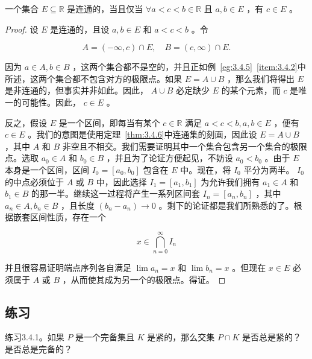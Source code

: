 \begin{Thm}
  \label{thm:3.4.7}
  一个集合 \(E \subseteq  \mathbb{R}\) 是连通的，当且仅当 \(\forall a < c < b\in \mathbb{R}\)  且 \(a,b \in  E\) ，有 \(c \in  E\) 。
\end{Thm}
\begin{proof}
设 \(E\) 是连通的，且设 \(a,b \in  E\) 和 \(a < c < b\) 。令

\[
A = \left( {-\infty ,c}\right)  \cap  E, \quad B = \left( {c,\infty }\right)  \cap  E.
\]

因为 \(a \in  A, b \in  B\) ，这两个集合都不是空的，并且正如例~\ref{eg:3.4.5}~\ref{item:3.4.2}中所述，这两个集合都不包含对方的极限点。如果 \(E = A \cup  B\) ，那么我们将得出 \(E\) 是非连通的，但事实并非如此。因此， \(A \cup  B\) 必定缺少 \(E\) 的某个元素，而 \(c\) 是唯一的可能性。因此， \(c \in  E\) 。

反之，假设 \(E\) 是一个区间，即每当有某个 $c\in \mathbb{R}$ 满足 \(a < c < b, a,b\in E\) ，便有 \(c \in  E\) 。我们的意图是使用定理~\ref{thm:3.4.6}中连通集的刻画，因此设 \(E = A \cup  B\) ，其中 \(A\) 和 \(B\) 非空且不相交。我们需要证明其中一个集合包含另一个集合的极限点。选取 \({a}_{0} \in  A\) 和 \({b}_{0} \in  B\) ，并且为了论证方便起见，不妨设 \({a}_{0} < {b}_{0}\) 。由于 \(E\) 本身是一个区间，区间 \({I}_{0} = \left\lbrack  {{a}_{0},{b}_{0}}\right\rbrack\) 包含在 \(E\) 中。现在，将 \({I}_{0}\) 平分为两半。 \({I}_{0}\) 的中点必须位于 \(A\) 或 \(B\) 中，因此选择 \({I}_{1} = \left\lbrack  {{a}_{1},{b}_{1}}\right\rbrack\) 为允许我们拥有 \({a}_{1} \in  A\) 和 \({b}_{1} \in  B\) 的那一半。继续这一过程将产生一系列区间套 \({I}_{n} = \left\lbrack  {{a}_{n},{b}_{n}}\right\rbrack\) ，其中 \({a}_{n} \in  A,{b}_{n} \in  B\) ，且长度 \(\left( {{b}_{n} - {a}_{n}}\right)  \rightarrow  0\) 。剩下的论证都是我们所熟悉的了。根据嵌套区间性质，存在一个

\[
x \in  \mathop{\bigcap }\limits_{{n = 0}}^{\infty }{I}_{n}
\]

并且很容易证明端点序列各自满足 \(\lim {a}_{n} = x\) 和 \(\lim {b}_{n} = x\) 。但现在 \(x \in  E\) 必须属于 \(A\) 或 \(B\) ，从而使其成为另一个的极限点。得证。
\end{proof}


\subsection{练习}

练习3.4.1。如果 \(P\) 是一个完备集且 \(K\) 是紧的，那么交集 \(P \cap  K\) 是否总是紧的？是否总是完备的？

